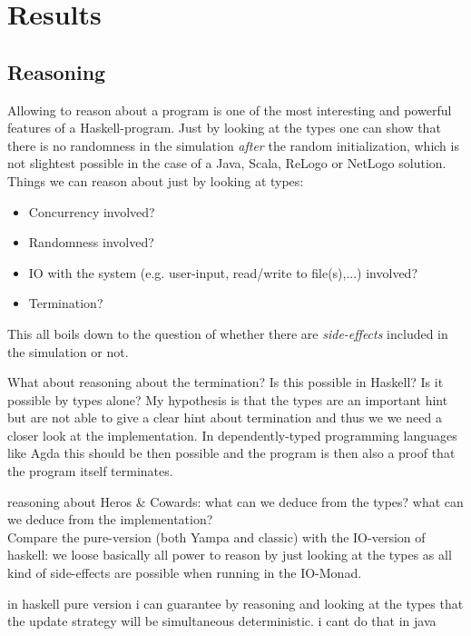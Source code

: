\section{Results}

\graphicspath{{./fig/}}	%


\subsection{Reasoning}
Allowing to reason about a program is one of the most interesting and powerful features of a Haskell-program. Just by looking at the types one can show that there is no randomness in the simulation \textit{after} the random initialization, which is not slightest possible in the case of a Java, Scala, ReLogo or NetLogo solution. Things we can reason about just by looking at types:

\begin{itemize}
\item Concurrency involved?
\item Randomness involved?
\item IO with the system (e.g. user-input, read/write to file(s),...) involved?
\item Termination?
\end{itemize}

This all boils down to the question of whether there are \textit{side-effects} included in the simulation or not.

What about reasoning about the termination? Is this possible in Haskell? Is it possible by types alone? My hypothesis is that the types are an important hint but are not able to give a clear hint about termination and thus we we need a closer look at the implementation. In dependently-typed programming languages like Agda this should be then possible and the program is then also a 
proof that the program itself terminates.

reasoning about Heros \& Cowards: what can we deduce from the types? what can we deduce from the implementation?\\

Compare the pure-version (both Yampa and classic) with the IO-version of haskell: we loose basically all power to reason by just looking at the types as all kind of side-effects are possible when running in the IO-Monad.

in haskell pure version i can guarantee by reasoning and looking at the types that the update strategy will be simultaneous deterministic. i cant do that in java


